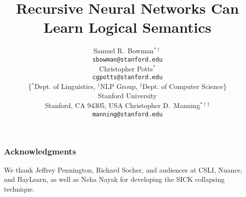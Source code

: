 \documentclass[11pt]{article}
\title{Recursive Neural Networks Can Learn Logical Semantics}
\author{
Samuel R.\ Bowman$^{\ast\dag}$ \\
\texttt{sbowman@stanford.edu} \\[2ex]
\And
Christopher Potts$^{\ast}$\\
\texttt{cgpotts@stanford.edu} \\[2ex]
\{$^{\ast}$Dept. of Linguistics, $^{\dag}$NLP Group, $^{\ddag}$Dept. of Computer Science\}\\
Stanford University \\
Stanford, CA 94305, USA
\And
Christopher D.\ Manning$^{\ast\dag\ddag}$\\
\texttt{manning@stanford.edu}\\[2ex]
}
\date{}
\begin{document}
\maketitle










\subsubsection*{Acknowledgments}

We thank Jeffrey Pennington, Richard Socher, and audiences at CSLI, Nuance, and BayLearn, as well as Neha Nayak for developing the SICK collapsing technique.


%
%
%
%
%
\end{document}
